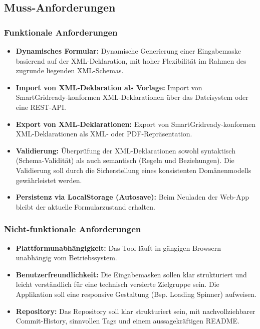 \documentclass[a4paper,12pt]{article}
\begin{document}
\subsection{Muss-Anforderungen}
\subsubsection{Funktionale Anforderungen}
\begin{itemize}
  \item \textbf{Dynamisches Formular:}  
    Dynamische Generierung einer Eingabemaske basierend auf der XML-Deklaration, mit hoher Flexibilität im Rahmen des zugrunde liegenden XML-Schemas.

  \item \textbf{Import von XML-Deklaration als Vorlage:}  
    Import von SmartGridready-konformen XML-Deklarationen über das Dateisystem oder eine REST-API.

  \item \textbf{Export von XML-Deklarationen:}  
    Export von SmartGridready-konformen XML-Deklarationen als XML- oder PDF-Repräsentation.

  \item \textbf{Validierung:}  
    Überprüfung der XML-Deklarationen sowohl syntaktisch (Schema-Validität) als auch semantisch (Regeln und Beziehungen). Die Validierung soll durch die Sicherstellung eines konsistenten Domänenmodells gewährleistet werden.

  \item \textbf{Persistenz via LocalStorage (Autosave):}  
    Beim Neuladen der Web-App bleibt der aktuelle Formularzustand erhalten.
\end{itemize}

\subsubsection{Nicht-funktionale Anforderungen}
\begin{itemize}
  \item \textbf{Plattformunabhängigkeit:}  
    Das Tool läuft in gängigen Browsern unabhängig vom Betriebssystem.

  \item \textbf{Benutzerfreundlichkeit:}  
    Die Eingabemasken sollen klar strukturiert und leicht verständlich für eine technisch versierte Zielgruppe sein. Die Applikation soll eine responsive Gestaltung (Bsp. Loading Spinner) aufweisen.

  \item \textbf{Repository:}  
    Das Repository soll klar strukturiert sein, mit nachvollziehbarer Commit-History, sinnvollen Tags und einem aussagekräftigen README.

\end{itemize}
\end{document}
